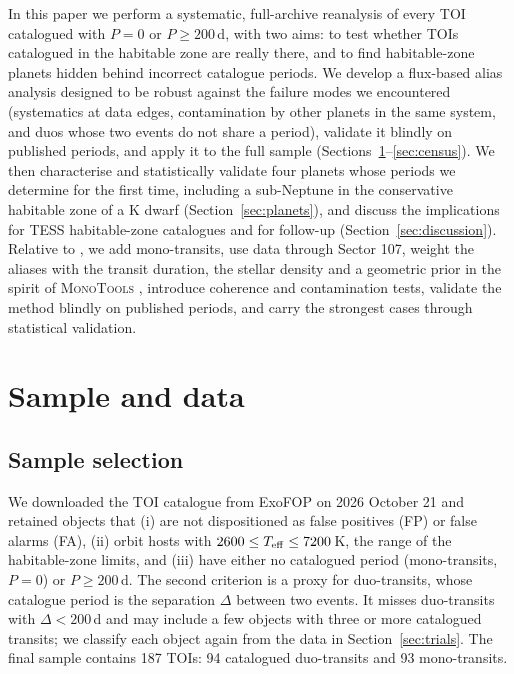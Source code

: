 \documentclass[fleqn,usenatbib]{mnras}
\newcommand{\Teff}{\ensuremath{T_{\rm eff}}}
\begin{document}
In this paper we perform a systematic, full-archive reanalysis of every TOI catalogued with $P = 0$ or $P \geq 200$\,d, with two aims: to test whether TOIs catalogued in the habitable zone are really there, and to find habitable-zone planets hidden behind incorrect catalogue periods. We develop a flux-based alias analysis designed to be robust against the failure modes we encountered (systematics at data edges, contamination by other planets in the same system, and duos whose two events do not share a period), validate it blindly on published periods, and apply it to the full sample (Sections~\ref{sec:sample}--\ref{sec:census}). We then characterise and statistically validate four planets whose periods we determine for the first time, including a sub-Neptune in the conservative habitable zone of a K dwarf (Section~\ref{sec:planets}), and discuss the implications for TESS habitable-zone catalogues and for follow-up (Section~\ref{sec:discussion}). Relative to \citet{Bass2025}, we add mono-transits, use data through Sector 107, weight the aliases with the transit duration, the stellar density and a geometric prior in the spirit of \textsc{MonoTools} \citep{Osborn2022}, introduce coherence and contamination tests, validate the method blindly on published periods, and carry the strongest cases through statistical validation.

\section{Sample and data}
\label{sec:sample}

\subsection{Sample selection}

We downloaded the TOI catalogue from ExoFOP on 2026 October 21 and retained objects that (i) are not dispositioned as false positives (FP) or false alarms (FA), (ii) orbit hosts with $2600 \leq \Teff \leq 7200$\,K, the range of the \citet{Kopparapu2014} habitable-zone limits, and (iii) have either no catalogued period (mono-transits, $P = 0$) or $P \geq 200$\,d. The second criterion is a proxy for duo-transits, whose catalogue period is the separation $\Delta$ between two events. It misses duo-transits with $\Delta < 200$\,d and may include a few objects with three or more catalogued transits; we classify each object again from the data in Section~\ref{sec:trials}. The final sample contains 187 TOIs: 94 catalogued duo-transits and 93 mono-transits.
\end{document}
